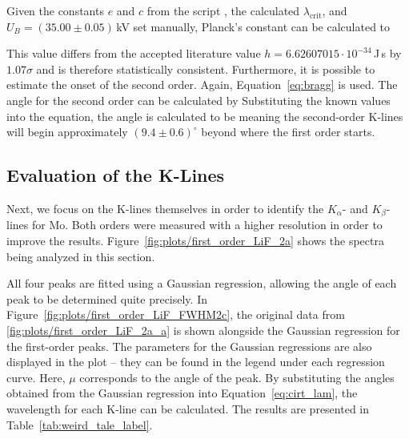 Given the constants $e$ and $c$ from the script \cite{skriptPAP22}, the calculated $\lambda_\text{crit}$, and $U_B = (35.00 \pm 0.05)$\,kV set manually, Planck's constant can be calculated to 

This value differs from the accepted literature value $h = 6.62607015 \cdot 10^{-34}$\,J\,s by $1.07\sigma$ and is therefore statistically consistent.
Furthermore, it is possible to estimate the onset of the second order. Again, Equation~\ref{eq:bragg} is used. The angle for the second order can be calculated by
Substituting the known values into the equation, the angle is calculated to be
meaning the second-order K-lines will begin approximately $(9.4 \pm 0.6)^\circ$ beyond where the first order starts.

\subsection{Evaluation of the K-Lines}
Next, we focus on the K-lines themselves in order to identify the $K_\alpha$- and $K_\beta$-lines for Mo. Both orders were measured with a higher resolution in order to improve the results. Figure~\ref{fig:plots/first_order_LiF_2a} shows the spectra being analyzed in this section.

All four peaks are fitted using a Gaussian regression, allowing the angle of each peak to be determined quite precisely. In Figure~\ref{fig:plots/first_order_LiF_FWHM2c}, the original data from \ref{fig:plots/first_order_LiF_2a_a} is shown alongside the Gaussian regression for the first-order peaks.
The parameters for the Gaussian regressions are also displayed in the plot -- they can be found in the legend under each regression curve. Here, $\mu$ corresponds to the angle of the peak. By substituting the angles obtained from the Gaussian regression into Equation~\ref{eq:cirt_lam}, the wavelength for each K-line can be calculated.
The results are presented in Table~\ref{tab:weird_tale_label}.

